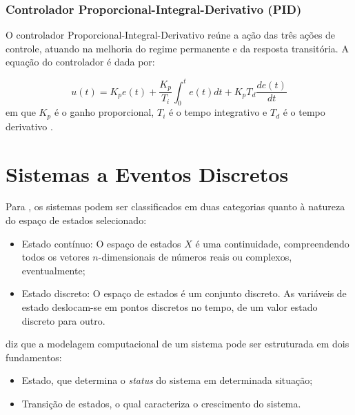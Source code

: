 \subsubsection{Controlador Proporcional-Integral-Derivativo (PID)}

O controlador Proporcional-Integral-Derivativo reúne a ação das três ações de controle, atuando na melhoria do 
regime permanente e da resposta transitória. 
A equação do controlador é dada por:

\begin{equation}
 u(t) = K_pe(t) + \frac{K_p}{T_i}\int_{0}^{t}e(t)dt + K_pT_d\frac{de(t)}{dt}
\end{equation}
em que  $K_p$ é o ganho proporcional, $T_i$ é o tempo integrativo e $T_d$ é o tempo derivativo \cite{ogata}.


\vspace{1cm}
\section{Sistemas a Eventos Discretos} \label{cap:sed}


Para , os sistemas podem ser classificados em duas categorias quanto à natureza do espaço de estados 
selecionado: 
\begin{itemize}
 \item Estado contínuo: O espaço de estados $X$ é uma continuidade, compreendendo todos os vetores $n$-dimensionais de números reais ou 
 complexos, eventualmente;
 
 \item Estado discreto: O espaço de estados é um conjunto discreto. As variáveis de estado deslocam-se em pontos discretos no tempo, de 
 um valor estado discreto para outro.
\end{itemize}

 diz que a modelagem computacional de um sistema pode ser estruturada em dois fundamentos:
\begin{itemize}
 \item Estado, que determina o \textit{status} do sistema em determinada situação;
 \item Transição de estados, o qual caracteriza o crescimento do sistema.
\end{itemize}

